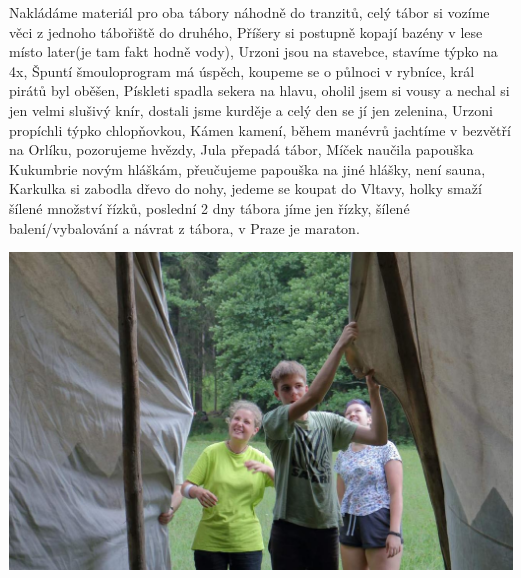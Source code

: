 Nakládáme materiál pro oba tábory náhodně do tranzitů, celý tábor si vozíme věci z jednoho tábořiště do druhého, Příšery si postupně kopají bazény v lese místo later(je tam fakt hodně vody), Urzoni jsou na stavebce, stavíme týpko na 4x, Špuntí šmouloprogram má úspěch, koupeme se o půlnoci v rybníce, král pirátů byl oběšen, Pískleti spadla sekera na hlavu, oholil jsem si vousy a nechal si jen velmi slušivý knír, dostali jsme kurděje a celý den se jí jen zelenina, Urzoni propíchli týpko chlopňovkou, Kámen kamení, během manévrů jachtíme v bezvětří na Orlíku, pozorujeme hvězdy, Jula přepadá tábor, Míček naučila papouška Kukumbrie novým hláškám, přeučujeme papouška na jiné hlášky, není sauna, Karkulka si zabodla dřevo do nohy, jedeme se koupat do Vltavy, holky smaží šílené množství řízků, poslední 2 dny tábora jíme jen řízky, šílené balení/vybalování a návrat z tábora, v Praze je maraton. 

\begin{center}

\includegraphics[width=\textwidth]{img/udo_clanky/zapinani.jpg}

\end{center}


\clearpage
